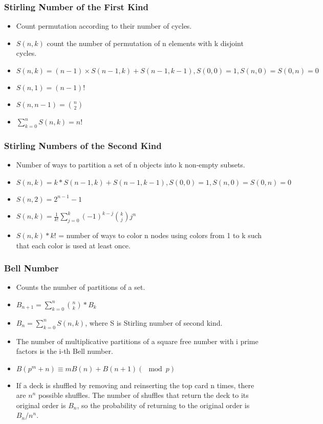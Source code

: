 \subsubsection{Stirling Number of the First Kind}
\vspace{2.5mm}
\begin{itemize}
    \item Count permutation according to their number of cycles.
    \item $S(n,k)$ count the number of permutation of n elements with k disjoint cycles.
    \item $S(n,k) = (n-1) \times S(n-1,k) + S(n-1, k-1), S(0,0) = 1, S(n,0) = S(0,n) = 0$
    \item $S(n,1) = (n-1)!$
    \item $S(n,n-1) = \binom{n}{2}$
    \item $\sum_{k=0}^n S(n,k) = n!$
\end{itemize}

\subsubsection{Stirling Numbers of the Second Kind}
\vspace{2.5mm}
\begin{itemize}
    \item Number of ways to partition a set of n objects into k non-empty subsets.
    \item $S(n,k) = k*S(n-1,k)+S(n-1,k-1), S(0,0) = 1, S(n,0) = S(0,n) = 0$
    \item $S(n,2) = 2^{n-1}-1$
    \item $S(n,k) = \frac{1}{k!}\sum\limits_{j=0}^{k}(-1)^{k-j}\binom{k}{j}j^n$
   
    \item $S(n,k)*k!$ = number of ways to color n nodes using colors from 1 to k such that each color is used at least once.
\end{itemize}
\subsubsection{Bell Number}
\vspace{2.5mm}
\begin{itemize}
    \item Counts the number of partitions of a set.
    \item $B_{n+1} = \sum_{k=0}^n \binom{n}{k}*B_k$
    \item $B_n = \sum_{k=0}^n S(n,k)$, where S is Stirling number of second kind.
    \item The number of multiplicative partitions of a square free number with i prime factors is the i-th Bell number.
    \item $B(p^m+n) \equiv mB(n)+B(n+1) (\mod p)$
    \item If a deck is shuffled by removing and reinserting the top card n times, there are $n^n$ possible shuffles. The number of shuffles that return the deck to its original order is $B_n$, so the probability of returning to the original order is $B_n/n^n$.
\end{itemize}
